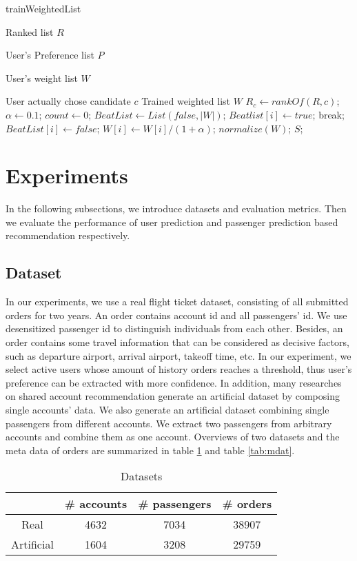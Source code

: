 \documentclass{llncs}
\begin{document}
\begin{algorithm}[htb]
\caption{trainWeightedList}
\begin{algorithmic}[1]
\label{alg:6}
\REQUIRE \par
Ranked list $R$ \par
User's Preference list $P$ \par
User's weight list $W$ \par
User actually chose candidate $c$
\ENSURE Trained weighted list $W$
\STATE $R_c \leftarrow rankOf(R,c)$;
\STATE $\alpha \leftarrow 0.1$;
\STATE $count \leftarrow 0$;
\STATE $BeatList \leftarrow List(false,|W|)$;
\STATE $Beatlist[i] \leftarrow true$;
\STATE break;
\ENDIF
\ENDFOR
{}
\STATE $BeatList[i] \leftarrow false$;
\STATE $W[i] \leftarrow W[i] / (1+\alpha)$;
\ENDIF
\ENDFOR
\ENDWHILE
\STATE $normalize(W)$;
\RETURN $S$;
\end{algorithmic} 
\end{algorithm}


\section{Experiments}
\label{sec:exp}
In the following subsections, we introduce datasets and evaluation metrics. Then we evaluate the performance of user prediction and passenger prediction based recommendation respectively.
\subsection{Dataset}
In our experiments, we use a real flight ticket dataset, consisting of all submitted orders for two years. An order contains account id and all passengers' id. We use desensitized passenger id to distinguish individuals from each other. Besides, an order contains some travel information that can be considered as decisive factors, such as departure airport, arrival airport, takeoff time, etc. In our experiment, we select active users whose amount of history orders reaches a threshold, thus user's preference can be extracted with more confidence. In addition, many researches\cite{amy:guess}\cite{yutaka:modeling} on shared account recommendation generate an artificial dataset by composing single accounts' data. We also generate an artificial dataset combining single passengers from different accounts. We extract two passengers from arbitrary accounts and combine them as one account. Overviews of two datasets and the meta data of orders are summarized in table \ref{tab:dat} and table \ref{tab:mdat}.
\begin{table}[!htbp]
\centering
\caption{\label{tab:dat}Datasets}
\begin{tabular}{|c|c|c|c|} \hline
& \# accounts & \# passengers & \# orders\\ \hline
Real & 4632&7034&38907 \\ \hline
Artificial &1604&3208&29759\\ \hline
\end{tabular}
\end{table}
\end{document}
